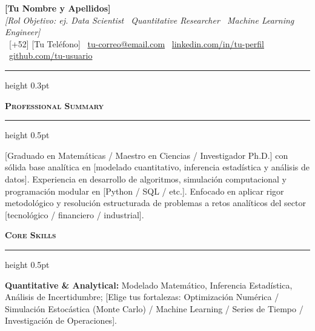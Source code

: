 \documentclass[11pt]{article}
\newcommand{\cvsection}[1]{%
  \vspace{0.35cm}%
  {\bfseries\large\scshape #1}%
  \vspace{0.06cm}%
  {\color{rulecolor}\hrule height 0.5pt}%
  \vspace{0.2cm}%
}
\newcommand{\semilarge}{\fontsize{14}{16.5}\selectfont}
\begin{document}
\begin{center}
  {\semilarge \textbf{[Tu Nombre y Apellidos]}} \\[0.12cm]
  {\large \textit{[Rol Objetivo: ej. Data Scientist \textbar \ Quantitative Researcher \textbar \ Machine Learning Engineer]}} \\[0.18cm]
  \small
  \faPhone~[+52] [Tu Teléfono] \quad \textbar \quad
  \faEnvelope~\href{mailto:tu-correo@email.com}{tu-correo@email.com} \quad \textbar \quad
  \faLinkedin~\href{https://www.linkedin.com/in/tu-perfil/}{linkedin.com/in/tu-perfil} \quad \textbar \quad
  \faGithub~\href{https://github.com/tu-usuario}{github.com/tu-usuario}
\end{center}

\vspace{-0.05cm}
{\color{rulecolor}\hrule height 0.3pt}

\cvsection{Professional Summary}
\small
[Graduado en Matemáticas / Maestro en Ciencias / Investigador Ph.D.] con sólida base analítica en [modelado cuantitativo, inferencia estadística y análisis de datos]. Experiencia en desarrollo de algoritmos, simulación computacional y programación modular en [Python / SQL / etc.]. Enfocado en aplicar rigor metodológico y resolución estructurada de problemas a retos analíticos del sector [tecnológico / financiero / industrial].

\cvsection{Core Skills}
\small
\textbf{Quantitative \& Analytical:} Modelado Matemático, Inferencia Estadística, Análisis de Incertidumbre; [Elige tus fortalezas: Optimización Numérica / Simulación Estocástica (Monte Carlo) / Machine Learning / Series de Tiempo / Investigación de Operaciones].
\end{document}
